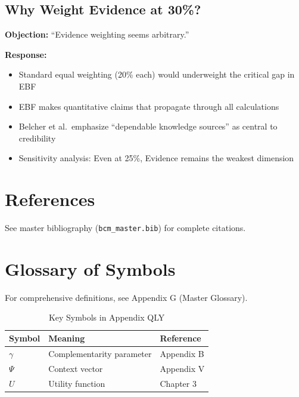 \documentclass[11pt,a4paper]{article}
\begin{document}
\subsection{Why Weight Evidence at 30\%?}

\textbf{Objection:} ``Evidence weighting seems arbitrary.''

\textbf{Response:}
\begin{itemize}
    \item Standard equal weighting (20\% each) would underweight the critical gap in EBF
    \item EBF makes quantitative claims that propagate through all calculations
    \item Belcher et al.\ emphasize ``dependable knowledge sources'' as central to credibility
    \item Sensitivity analysis: Even at 25\%, Evidence remains the weakest dimension
\end{itemize}



\section{References}
\label{sec:references}

See master bibliography (\texttt{bcm\_master.bib}) for complete citations.

\nocite{bcm_master}


\section{Glossary of Symbols}
\label{sec:qly-glossary}

For comprehensive definitions, see Appendix G (Master Glossary).

\begin{table}[htbp]
\centering
\caption{Key Symbols in Appendix QLY}
\begin{tabular}{lll}
\toprule
\textbf{Symbol} & \textbf{Meaning} & \textbf{Reference} \\
\midrule
$\gamma$ & Complementarity parameter & Appendix B \\
$\Psi$ & Context vector & Appendix V \\
$U$ & Utility function & Chapter 3 \\
\bottomrule
\end{tabular}
\end{table}
\end{document}

